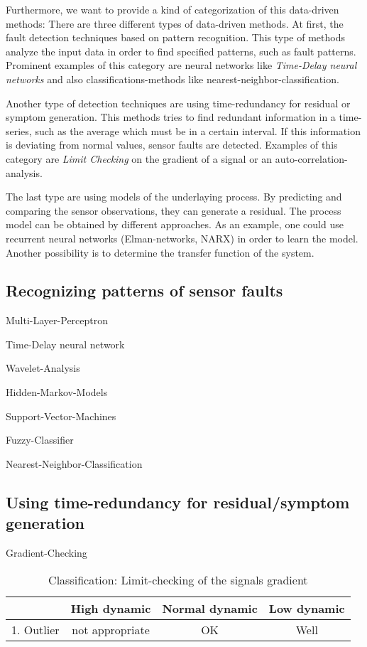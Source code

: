 \documentclass[a4paper,11pt]{article}
\begin{document}
Furthermore, we want to provide a kind of categorization of this data-driven methods: 
There are three different types of data-driven methods. At first, the fault detection techniques based on pattern recognition. This type of methods analyze the input data in order to find specified patterns, such as fault patterns. Prominent examples of this category are neural networks like \textit{Time-Delay neural networks} and also classifications-methods like nearest-neighbor-classification.

Another type of detection techniques are using time-redundancy for residual or symptom generation. This methods tries to find redundant information in a time-series, such as the average which must be in a certain interval. If this information is deviating from normal values, sensor faults are detected. Examples of this category are \textit{Limit Checking} on the gradient of a signal or an auto-correlation-analysis.

The last type are using models of the underlaying process. By predicting and comparing the sensor observations, they can generate a residual. The process model can be obtained by different approaches. As an example, one could use recurrent neural networks (Elman-networks, NARX) in order to \glqq learn \grqq the model. Another possibility is to determine the transfer function of the system.

\subsection{Recognizing patterns of sensor faults}

Multi-Layer-Perceptron

Time-Delay neural network

Wavelet-Analysis

Hidden-Markov-Models

Support-Vector-Machines

Fuzzy-Classifier

Nearest-Neighbor-Classification 


\subsection{Using time-redundancy for residual/symptom generation}

Gradient-Checking

 \begin{table}[h]
 \caption{Classification: \glqq Limit-checking of the signals gradient \grqq}
 \begin{tabular}{c|c|c|c}
                    & High dynamic        & Normal dynamic        & Low dynamic \\  \hline
 1. Outlier         & not appropriate     &      OK               &       Well
 \end{tabular}
 \label{tab:lc_gradient}
 \end{table}
\end{document}
